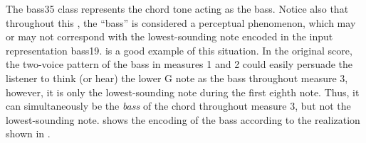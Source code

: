 
The \gls{bass35} class represents the chord tone acting as
the bass. 
Notice also that throughout this \thesisdiss{}, the ``bass''
is considered a perceptual phenomenon, which may or may not
correspond with the lowest-sounding note encoded in the
input representation \gls{bass19}.  is
a good example of this situation. In the original score, the
two-voice pattern of the bass in measures 1 and 2 could
easily persuade the listener to think (or hear) the lower G
note as the bass throughout measure 3, however, it is only
the lowest-sounding note during the first eighth note. Thus,
it can simultaneously be the \emph{bass} of the chord
throughout measure 3, but not the lowest-sounding note.
 shows the encoding of the bass according
to the realization shown in .







